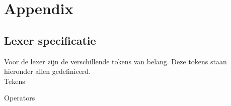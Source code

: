 \chapter{Appendix}
    \label{chap:appendix}
\section{Lexer specificatie}
    \label{sec:lexer_specificatie}
Voor de lexer zijn de verschillende tokens van belang. Deze tokens staan hieronder allen gedefinieerd. \\ 

Tekens
\begin{description}
    \item {}      
    \item {}      \tab{:}
    \item {}  \tab{;}
    \item {}     \tab{(} 
    \item {}     \tab{)} 
    \item {}     \tab{[}
    \item {}     \tab{]}
    \item {}     \tab{\{}
    \item {}     \tab{\}}
    \item {}      \tab{,}
    \item {} 
    \item {} \tab{\textbackslash}
    \item {}       
\end{description}

\clearpage

Operators
\begin{description}
    \item {}      
    \item {}       \tab{+}
    \item {}      \tab{-}
    \item {}    \tab{/}
    \item {}    \tab{*}
    \item {}      \tab{\^}
    \item {}         \tab{\textless}
    \item {}         \tab{\textgreater}
    \item {}        \tab{\textgreater =}
    \item {}        \tab{\textless =}
    \item {}         \tab{=}
    \item {}        \tab{!}
    \item {}     \tab{==}
    \item {}         \tab{\textbar \textbar}
    \item {}        \tab{\&\&}
\end{description}

